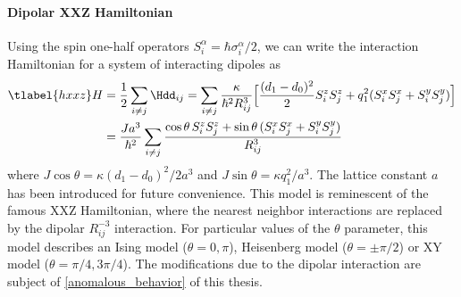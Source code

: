 \paragraph{Dipolar XXZ Hamiltonian}
Using the spin one-half operators $S^\alpha_i = \hbar \sigma^\alpha_i/2$, we can write the interaction Hamiltonian for a system of interacting dipoles as
\begin{align} \tlabel{hxxz}
    H &= \frac{1}{2} \sum_{i\ne j} \Hdd_{ij} = \sum_{i\ne j} \frac{\kappa}{\hbar^2 R_{ij}^3} \Big[ \frac{(d_1-d_0)^2}{2} S^z_i S^z_j  + q_1^2 (S^x_i S^x_j + S^y_i S^y_j) \Big] \\
         &= \frac{Ja^3}{\hbar^2} \sum_{i\ne j} \frac{\cos\theta\, S^z_i S^z_j  + \sin\theta\, (S^x_i S^x_j + S^y_i S^y_j)}{R_{ij}^3}
\end{align}
where $J\cos\theta = \kappa (d_1-d_0)^2/2a^3$ and $J\sin\theta = \kappa q_1^2/a^3$. The lattice constant $a$ has been introduced for future convenience.
This model is reminescent of the famous XXZ Hamiltonian, where the nearest neighbor interactions are replaced by the dipolar $R_{ij}^{-3}$ interaction. For particular values of the $\theta$ parameter, this model describes an Ising model ($\theta = 0, \pi$), Heisenberg model ($\theta=\pm \pi/2$) or XY model ($\theta=\pi/4, 3\pi/4$). The modifications due to the dipolar interaction are subject of \cref{anomalous_behavior} of this thesis.

